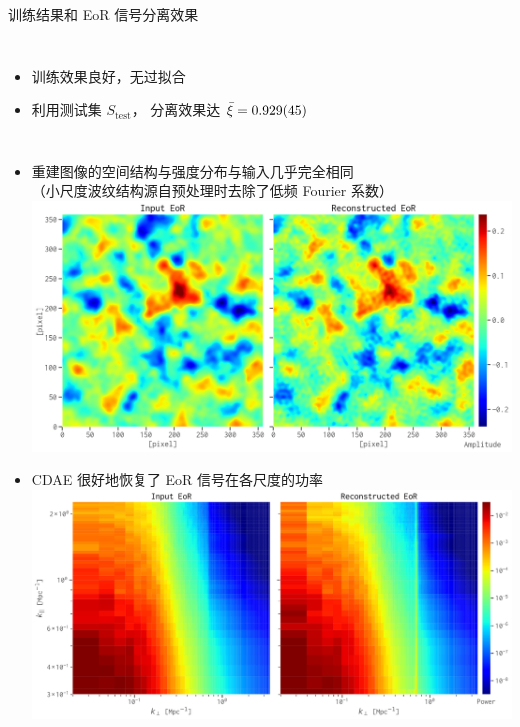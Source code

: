 \documentclass{beamer}
\newcommand{\R}[1]{\text{#1}}  %
\begin{document}
\begin{frame}{训练结果和 EoR 信号分离效果}
  \begin{columns}
    \begin{itemize}
      \item 训练效果良好，无过拟合
      \item 利用测试集 $S_{\R{test}}$，
        分离效果达 $\bar{\xi} = \num{0.929 +- 0.045}$
    \end{itemize}
    \vspace{-1ex}

  \end{columns}
\end{frame}

\begin{frame}
  \vspace{1ex}
  \begin{itemize}
    \item 重建图像的空间结构与强度分布与输入几乎完全相同 \\
      （小尺度波纹结构源自预处理时去除了低频 Fourier 系数）
      \\[1ex]
      \includegraphics[height=0.42\textheight]{cdae-eor-img-comp}
    \item CDAE 很好地恢复了 EoR 信号在各尺度的功率
      \\[1ex]
      \includegraphics[height=0.42\textheight]{cdae-eor-ps-comp}
  \end{itemize}
\end{frame}
\end{document}
